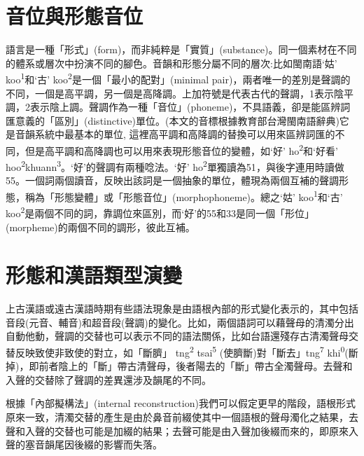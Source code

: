 \section{\rmfamily 音位與形態音位}

\textrm{語言是一種「形式」(form)}，\textrm{而非純粹是「實質」(substance)}。\textrm{同一個素材在不同的體系或層次中扮演不同的腳色。音韻和形態分屬不同的層次:比如閩南語‘姑’ koo}\textrm{\textsuperscript{1}}\textrm{和‘古’ koo}\textrm{\textsuperscript{2}}\textrm{是一個「最小的配對」(minimal pair)}，\textrm{兩者唯一的差別是聲調的不同，一個是高平調，另一個是高降調。上加符號是代表古代的聲調，1表示陰平調，2表示陰上調。聲調作為一種「音位」(phoneme)}，\textrm{不具語義，卻是能區辨詞匯意義的「區別」(distinctive)單位。(本文的音標根據教育部台灣閩南語辭典)它是音韻系統中最基本的單位, 這裡高平調和高降調的替換可以用來區辨詞匯的不同，但是高平調和高降調也可以用來表現形態音位的變體，如‘好’ ho}\textrm{\textsuperscript{2}}\textrm{和‘好看’ hoo}\textrm{\textsuperscript{2}}\textrm{khuann}\textrm{\textsuperscript{3}}。\textrm{‘好’的聲調有兩種唸法。‘好’ ho}\textrm{\textsuperscript{2}}\textrm{單獨讀為51}，\textrm{與後字連用時讀做55}。\textrm{一個詞兩個讀音，反映出該詞是一個抽象的單位，體現為兩個互補的聲調形態，稱為「形態變體」或「形態音位」(morphophoneme)}。\textrm{總之‘姑’ koo}\textrm{\textsuperscript{1}}\textrm{和‘古’ koo}\textrm{\textsuperscript{2}}\textrm{是兩個不同的詞，靠調位來區別，而‘好’的55和33是同一個「形位」(morpheme)的兩個不同的調形，彼此互補。}

\section{\rmfamily 形態和漢語類型演變}

\textrm{上古漢語或遠古漢語時期有些語法現象是由語根內部的形式變化表示的，其中包括音段(元音、輔音)和超音段(聲調)的變化。比如，兩個語詞可以藉聲母的清濁分出自動他動，聲調的交替也可以表示不同的語法關係，比如台語還殘存古清濁聲母交替反映致使非致使的對立，如「斷臍」 tng}\textrm{\textsuperscript{2}} \textrm{tsai}\textrm{\textsuperscript{5}} \textrm{(使臍斷)對「斷去」tng}\textrm{\textsuperscript{7}} \textrm{khi}\textrm{\textsuperscript{0}}\textrm{(斷掉)}，\textrm{即前者陰上的「斷」帶古清聲母，後者陽去的「斷」帶古全濁聲母。去聲和入聲的交替除了聲調的差異還涉及韻尾的不同。}

\begin{stylei}
根據「內部擬構法」(internal reconstruction)我們可以假定更早的階段，語根形式原來一致，清濁交替的產生是由於鼻音前綴使其中一個語根的聲母濁化之結果，去聲和入聲的交替也可能是加綴的結果；去聲可能是由入聲加後綴而來的，即原來入聲的塞音韻尾因後綴的影響而失落。
\end{stylei}

